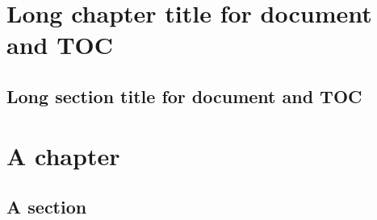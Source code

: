 
\section[Short chapter title]{Long chapter title for document and TOC}
\subsection[Short section title]{Long section title for document and TOC}
\lipsum
\section{A chapter}
\subsection{A section}
\lipsum
